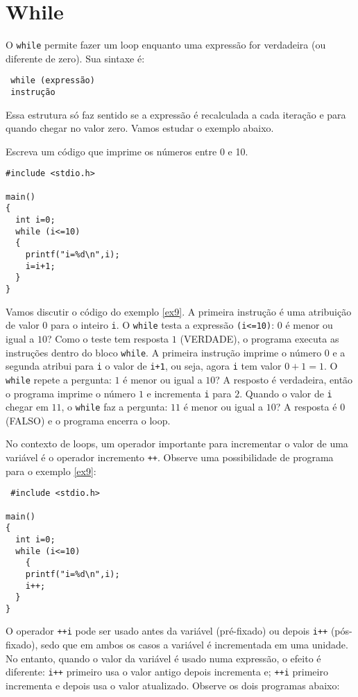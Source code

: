 \section{While}
O \verb|while| permite fazer um loop enquanto uma expressão for verdadeira (ou diferente de zero). Sua sintaxe é: 
\begin{verbatim}
 while (expressão)
 instrução 
\end{verbatim}
Essa estrutura só faz sentido se a expressão é recalculada a cada iteração e para quando chegar no valor zero. Vamos estudar o exemplo abaixo.
\begin{ex}\label{ex9}
 Escreva um código que imprime os números entre 0 e 10.
\end{ex}
\begin{verbatim}
#include <stdio.h>

main()
{
  int i=0;
  while (i<=10)
  {
    printf("i=%d\n",i);
    i=i+1;
  }
} 
\end{verbatim}
Vamos discutir o código do exemplo \ref{ex9}. A primeira instrução é uma atribuição de valor $0$ para o inteiro \verb|i|. O \verb|while| testa a expressão \verb|(i<=10)|: $0$ é menor ou igual a $10$? Como o teste tem resposta $1$ (VERDADE), o programa executa as instruções dentro do bloco \verb|while|. A primeira instrução imprime o número $0$ e a segunda atribui para \verb|i| o valor de \verb|i+1|, ou seja, agora \verb|i| tem valor $0+1=1$. O \verb|while| repete a pergunta: $1$ é menor ou igual a $10$? A resposto é verdadeira, então o programa imprime o número $1$ e incrementa \verb|i| para $2$. Quando o valor de \verb|i| chegar em $11$, o \verb|while| faz a pergunta: $11$ é menor ou igual a $10$? A resposta é $0$ (FALSO) e o programa encerra o loop.

No contexto de loops, um operador importante para incrementar o valor de uma variável é o operador incremento \verb|++|. Observe uma possibilidade de programa para o exemplo \ref{ex9}:
\begin{verbatim}
 #include <stdio.h>

main()
{
  int i=0;
  while (i<=10)
    {
    printf("i=%d\n",i);
    i++;
  }
}
\end{verbatim}
O operador \verb|++i| pode ser usado antes da variável (pré-fixado) ou depois \verb|i++| (pós-fixado), sedo que em ambos os casos a variável é incrementada em uma unidade. No entanto, quando o valor da variável é usado numa expressão, o efeito é diferente: \verb|i++| primeiro usa o valor antigo depois incrementa e; \verb|++i| primeiro incrementa e depois usa o valor atualizado. Observe os dois programas abaixo:


